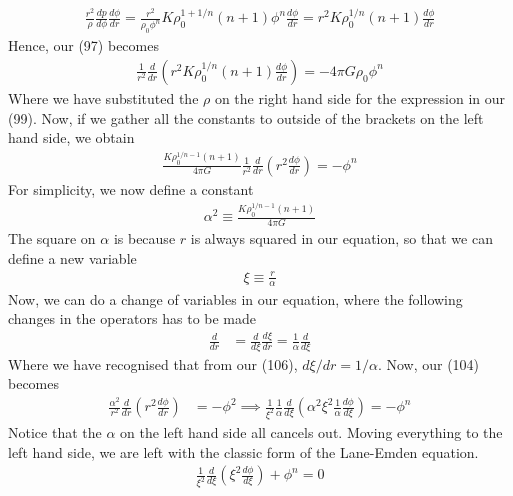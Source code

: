 \documentclass{article}
\begin{document}
\begin{align}
    \frac{r^2}{\rho}\frac{dp}{d\phi}\frac{d\phi}{dr}=\frac{r^2}{\rho_0\phi^n}K\rho_0^{1+1/n}(n+1)\phi^n\frac{d\phi}{dr}=r^2K\rho_0^{1/n}(n+1)\frac{d\phi}{dr}
\end{align}
Hence, our (97) becomes 
\begin{align}
    \frac{1}{r^2}\frac{d}{dr}(r^2K\rho_0^{1/n}(n+1)\frac{d\phi}{dr})=-4\pi G\rho_0\phi^n
\end{align}
Where we have substituted the $\rho$ on the right hand side for the expression in our (99).
Now, if we gather all the constants to outside of the brackets on the left hand side, we obtain 
\begin{align}
    \frac{K\rho_0^{1/n-1}(n+1)}{4\pi G}\frac{1}{r^2}\frac{d}{dr}(r^2\frac{d\phi}{dr})=-\phi^n
\end{align}
For simplicity, we now define a constant 
\begin{align}
    \alpha^2\equiv \frac{K\rho_0^{1/n-1}(n+1)}{4\pi G}
\end{align}
The square on $\alpha$ is because $r$ is always squared in our equation, so that we can define 
a new variable 
\begin{align}
    \xi\equiv\frac{r}{\alpha}
\end{align}
Now, we can do a change of variables in our equation, where the following changes in the operators has to be made 
\begin{align}
    \frac{d}{dr}&=\frac{d}{d\xi}\frac{d\xi}{dr}=\frac{1}{\alpha}\frac{d}{d\xi} 
\end{align}
Where we have recognised that from our (106), $d\xi/dr=1/\alpha$. Now, our (104) becomes 
\begin{align}
    \frac{\alpha^2}{r^2}\frac{d}{dr}(r^2\frac{d\phi}{dr})&=-\phi^2
    \implies \frac{1}{\xi^2}\frac{1}{\alpha}\frac{d}{d\xi}(\alpha^2\xi^2\frac{1}{\alpha}\frac{d\phi}{d\xi})=-\phi^n
\end{align}
Notice that the $\alpha$ on the left hand side all cancels out. Moving everything to the left hand side, we are left with the classic form 
of the Lane-Emden equation. 
\begin{align}
    \boxed{\frac{1}{\xi^2}\frac{d}{d\xi}(\xi^2\frac{d\phi}{d\xi})+\phi^n=0}
\end{align}
\end{document}
